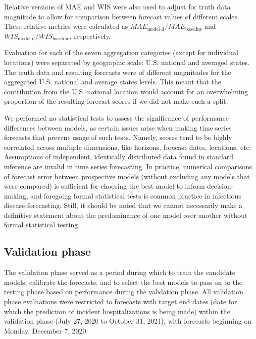 \documentclass[thesis]{umassthesis}  %
\begin{document}
Relative versions of MAE and WIS were also used to adjust for truth data magnitude to allow for comparison between forecast values of different scales. These relative metrics were calculated as $MAE_{\textrm{model d}} / MAE_{\textrm{baseline}}$ and $WIS_{\textrm{model d}} /WIS_{\textrm{baseline}}$, respectively\cite{cramer}.

Evaluation for each of the seven aggregation categories (except for individual locations) were separated by geographic scale: U.S. national and averaged states. The truth data and resulting forecasts were of different magnitudes for the aggregated U.S. national and average states levels. This meant that the contribution from the U.S. national location would account for an overwhelming proportion of the resulting forecast scores if we did not make such a split.

We performed no statistical tests to assess the significance of performance differences between models, as certain issues arise when making time series forecasts that prevent usage of such tests. Namely, scores tend to be highly correlated across multiple dimensions, like horizons, forecast dates, locations, etc. Assumptions of independent, identically distributed data found in standard inference are invalid in time series forecasting. In practice, numerical comparisons of forecast error between prospective models (without excluding any models that were compared) is sufficient for choosing the best model to inform decision-making, and foregoing formal statistical tests is common practice in infectious disease forecasting. Still, it should be noted that we cannot necessarily make a definitive statement about the predominance of one model over another without formal statistical testing\cite{lauer}.

\subsection{Validation phase} \label{validation_eval}
The validation phase served as a period during which to train the candidate models, calibrate the forecasts, and to select the best models to pass on to the testing phase based on performance during the validation phase. All validation phase evaluations were restricted to forecasts with target end dates (date for which the prediction of incident hospitalizations is being made) within the validation phase (July 27, 2020 to October 31, 2021), with forecasts beginning on Monday, December 7, 2020.
\end{document}

